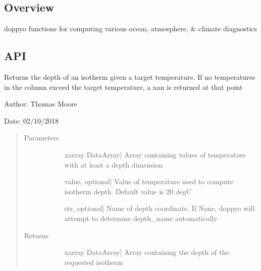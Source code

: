 \documentclass[letterpaper,10pt,english]{sphinxmanual}
\begin{document}
\subsection{Overview}
\label{\detokenize{diagnostic_doc:overview}}
doppyo functions for computing various ocean, atmosphere, \& climate diagnostics


\subsection{API}
\label{\detokenize{diagnostic_doc:api}}

\begin{fulllineitems}
\label{\detokenize{diagnostic_doc:diagnostic.isotherm_depth}}
Returns the depth of an isotherm given a target temperature. If no temperatures in the column
exceed the target temperature, a nan is returned at that point

\begin{DUlineblock}{0em}
\item[] Author: Thomas Moore
\item[] Date: 02/10/2018
\end{DUlineblock}
\begin{quote}\begin{description}
\item[{Parameters}] \leavevmode\begin{description}
\item[{}] \leavevmode{[}xarray DataArray{]}
Array containing values of temperature with at least a depth dimension

\item[{}] \leavevmode{[}value, optional{]}
Value of temperature used to compute isotherm depth. Default value is 20 degC

\item[{}] \leavevmode{[}str, optional{]}
Name of depth coordinate. If None, doppyo will attempt to determine depth\_name                     automatically

\end{description}

\item[{Returns}] \leavevmode\begin{description}
\item[{}] \leavevmode{[}xarray DataArray{]}
Array containing the depth of the requested isotherm


\end{description}
\end{description}
\end{quote}
\end{fulllineitems}
\end{document}
